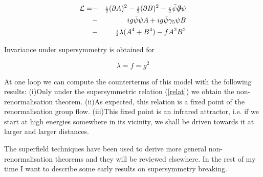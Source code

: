 \documentclass[a4paper,11pt]{article}
\begin{document}
\begin{eqnarray}
\label{genmod}
{\cal{L}} = & - &{\scriptstyle {\frac{1}{2}}}(\partial A)^2 - 
{\scriptstyle {\frac{1}{2}}}(\partial B)^2 - {\scriptstyle {\frac{i}{2}}} 
\bar{\psi}\partial \!\!\!/ \psi   \nonumber  \\
& - & ig \bar{\psi} \psi A + i g \bar{\psi} \gamma_5 \psi B  \\
& - &{\scriptstyle {\frac{1}{2}}} \lambda (A^4 + B^4 ) - fA^2 B^2 \nonumber
\end{eqnarray}

Invariance under supersymmetry is obtained for 

\begin{equation}
\label{relat}
\lambda = f = g^2
\end{equation}

 At one loop we can 
compute the counterterms of this model \cite{INT} with the following results:
(i)Only under the supersymmetric relation (\ref{relat}) we obtain the 
non-renormalisation theorem. (ii)As expected, this relation is a fixed point 
of the renormalisation group flow. (iii)This fixed point is an infrared attractor,
i.e. if we start at high energies somewhere in its vicinity, we shall be driven
towards it at larger and larger distances.

The superfield techniques have been used to derive more general non-renormalisation
theorems and they will be reviewed elsewhere. In the rest of my time I want to
describe some early results on supersymmetry breaking.
\end{document}
